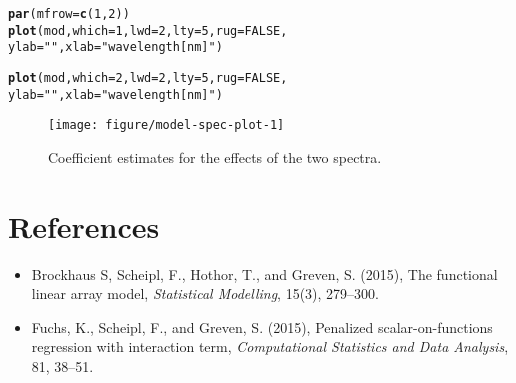 \documentclass{article}\usepackage[]{graphicx}\usepackage[]{color}
\makeatletter
\def\maxwidth{ %
  \ifdim\Gin@nat@width>\linewidth
    \linewidth
  \else
    \Gin@nat@width
  \fi
}
\newcommand{\hlnum}[1]{\textcolor[rgb]{0.686,0.059,0.569}{#1}}%
\newcommand{\hlstr}[1]{\textcolor[rgb]{0.192,0.494,0.8}{#1}}%
\newcommand{\hlstd}[1]{\textcolor[rgb]{0.345,0.345,0.345}{#1}}%
\newcommand{\hlkwc}[1]{\textcolor[rgb]{0.333,0.667,0.333}{#1}}%
\newcommand{\hlkwd}[1]{\textcolor[rgb]{0.737,0.353,0.396}{\textbf{#1}}}%
\newenvironment{kframe}{%
 \def\at@end@of@kframe{}%
 \ifinner\ifhmode%
  \def\at@end@of@kframe{\end{minipage}}%
  \begin{minipage}{\columnwidth}%
 \fi\fi%
 \def\FrameCommand##1{\hskip\@totalleftmargin \hskip-\fboxsep
 \colorbox{shadecolor}{##1}\hskip-\fboxsep
     \hskip-\linewidth \hskip-\@totalleftmargin \hskip\columnwidth}%
 \MakeFramed {\advance\hsize-\width
   \@totalleftmargin\z@ \linewidth\hsize
   \@setminipage}}%
 {\par\unskip\endMakeFramed%
 \at@end@of@kframe}
\newenvironment{knitrout}{}{} %
\makeatother
\begin{document}
\begin{knitrout}
\color{fgcolor}\begin{kframe}
\begin{alltt}
\hlkwd{par}\hlstd{(}\hlkwc{mfrow}\hlstd{=}\hlkwd{c}\hlstd{(}\hlnum{1}\hlstd{,}\hlnum{2}\hlstd{))}
\hlkwd{plot}\hlstd{(mod,} \hlkwc{which}\hlstd{=}\hlnum{1}\hlstd{,} \hlkwc{lwd}\hlstd{=}\hlnum{2}\hlstd{,} \hlkwc{lty}\hlstd{=}\hlnum{5}\hlstd{,} \hlkwc{rug}\hlstd{=}\hlnum{FALSE}\hlstd{,}
     \hlkwc{ylab}\hlstd{=}\hlstr{""}\hlstd{,} \hlkwc{xlab}\hlstd{=}\hlstr{"wavelength [nm]"}\hlstd{)}

\hlkwd{plot}\hlstd{(mod,} \hlkwc{which}\hlstd{=}\hlnum{2}\hlstd{,} \hlkwc{lwd}\hlstd{=}\hlnum{2}\hlstd{,} \hlkwc{lty}\hlstd{=}\hlnum{5}\hlstd{,} \hlkwc{rug}\hlstd{=}\hlnum{FALSE}\hlstd{,}
     \hlkwc{ylab}\hlstd{=}\hlstr{""}\hlstd{,} \hlkwc{xlab}\hlstd{=}\hlstr{"wavelength [nm]"}\hlstd{)}
\end{alltt}
\end{kframe}\begin{figure}
\texttt{[image: figure/model-spec-plot-1]} \caption[Coefficient estimates for the effects of the two spectra]{Coefficient estimates for the effects of the two spectra.}\label{fig:model-spec-plot}
\end{figure}


\end{knitrout}


\section*{References}
\begin{itemize}
\item[] Brockhaus S, Scheipl, F., Hothor, T., and Greven, S. (2015), The functional linear array model, 
        \textit{Statistical Modelling}, 15(3), 279--300. 
\item[] Fuchs, K., Scheipl, F., and Greven, S. (2015), 
        Penalized scalar-on-functions regression with interaction term,  
        \textit{Computational Statistics and Data Analysis}, 81, 38--51.
\end{itemize}
\end{document}
